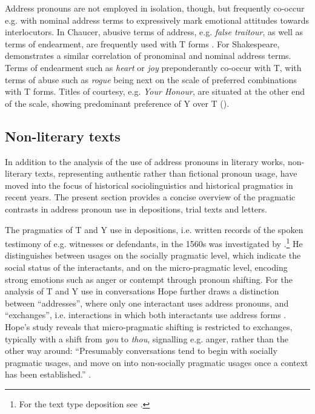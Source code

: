 \documentclass[output=paper,hidelinks]{langscibook}
\begin{document}
Address pronouns are not employed in isolation, though, but frequently co-occur e.g. with nominal address terms to expressively mark emotional attitudes towards interlocutors. In Chaucer, abusive terms of address, e.g. \textit{false traitour}, as well as terms of endearment, are frequently used with T forms \citep[150]{Mazzon2000}. For Shakespeare, \citet{Busse2003} demonstrates a similar correlation of pronominal and nominal address terms. Terms of endearment such as \textit{heart} or \textit{joy} preponderantly co-occur with T, with terms of abuse such as \textit{rogue} being next on the scale of preferred combinations with T forms. Titles of courtesy, e.g. \textit{Your Honour}, are situated at the other end of the scale, showing predominant preference of Y over T (\citeyear[214]{Busse2003}).

\subsection{Non-literary texts}\label{sec:eh:4.2}

In addition to the analysis of the use of address pronouns in literary works, non-literary texts, representing authentic rather than fictional pronoun usage, have moved into the focus of historical sociolinguistics and historical pragmatics in recent years. The present section provides a concise overview of the pragmatic contrasts in address pronoun use in depositions, trial texts and letters.

The pragmatics of T and Y use in depositions, i.e. written records of the spoken testimony of e.g. witnesses or defendants, in the 1560s was investigated by \citet{Hope1994}.\footnote{For the text type deposition see .}  He distinguishes between usages on the socially pragmatic level, which indicate the social status of the interactants, and on the micro-pragmatic level, encoding strong emotions such as anger or contempt through pronoun shifting. For the analysis of T and Y use in conversations Hope further draws a distinction between \enquote{addresses}, where only one interactant uses address pronouns, and \enquote{exchanges}, i.e. interactions in which both interactants use address forms \citep[147]{Hope1994}. Hope’s study reveals that micro-pragmatic shifting is restricted to exchanges, typically with a shift from \textit{you} to \textit{thou}, signalling e.g. anger, rather than the other way around: \enquote{Presumably conversations tend to begin with socially pragmatic usages, and move on into non-socially pragmatic usages once a context has been established.} \citep[147]{Hope1994}.
\end{document}
